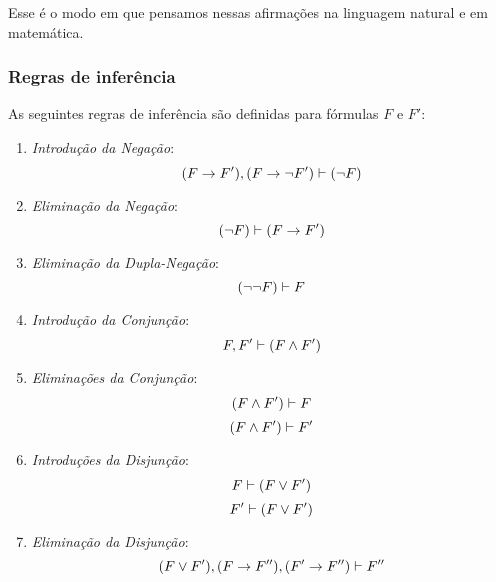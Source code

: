 Esse é o modo em que pensamos nessas afirmações na linguagem natural e em matemática.

\subsubsection{Regras de inferência}

As seguintes regras de inferência são definidas para fórmulas $F$ e $F'$:

\begin{enumerate}
\item \emph{Introdução da Negação}:
	\begin{equation*}
	(F \rightarrow F'), (F \rightarrow \lnot F') \vdash (\lnot F)
	\end{equation*}

\item \emph{Eliminação da Negação}:
	\begin{equation*}
	(\lnot F) \vdash (F \rightarrow F')
	\end{equation*}

\item \emph{Eliminação da Dupla-Negação}:
	\begin{equation*}
	(\lnot\lnot F) \vdash F
	\end{equation*}

\item \emph{Introdução da Conjunção}:
	\begin{equation*}
	F, F' \vdash (F \land F')
	\end{equation*}

\item \emph{Eliminações da Conjunção}:
	\begin{equation*}
	(F \land F') \vdash F
	\end{equation*}
	\begin{equation*}
	(F \land F') \vdash F'
	\end{equation*}

\item \emph{Introduções da Disjunção}:
	\begin{equation*}
	F \vdash (F \lor F')
	\end{equation*}
	\begin{equation*}
	F' \vdash (F \lor F')
	\end{equation*}

\item \emph{Eliminação da Disjunção}:
	\begin{equation*}
	(F \lor F'), (F \rightarrow F''), (F' \rightarrow F'') \vdash F''
	\end{equation*}


\end{enumerate}
